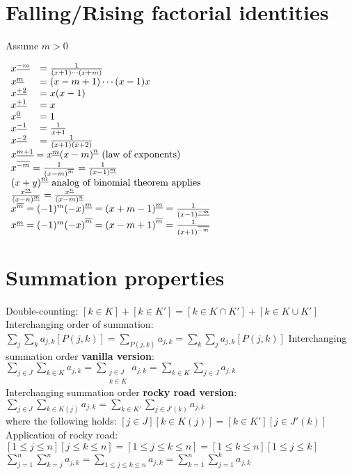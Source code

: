 \documentclass[10pt]{article}
\begin{document}
\begin{multicols}{3}
\section{Falling/Rising factorial identities}


{
\everymath{\displaystyle}
Assume $m > 0$
\begin{multicols}{2}
$
\begin{array}{ll}
x^{\underline{-m}} & = \frac{1}{(x+1)\cdots (x+m)}\\
x^{\underline{m}} & = (x-m+1) \cdots (x-1) x\\
x^{\underline{+2}} & = x(x-1)\\
x^{\underline{+1}} & = x\\
x^{\underline{0}} & = 1\\
x^{\underline{-1}} & = \frac{1}{x+1}\\
x^{\underline{-2}} & = \frac{1}{(x+1)(x+2)}\\
\end{array}
$
\vfill\null
\columnbreak
$
\begin{array}{l}
x^{\underline{m+1}} = x^{\underline{m}} {(x-m)}^{\underline{n}} \text{  (law of exponents)}\\
x^{\overline{-m}} = \frac{1}{{(x-m)}^{\overline{m}}} = \frac{1}{{(x-1)}^{\underline{m}}} \\
{(x+y)}^{\underline{m}} \text{ analog of binomial theorem applies}\\
\frac{{x}^{\underline{m}}}{{(x-n)}^{\underline{m}}} = \frac{{x}^{\underline{n}}}{{(x-m)}^{\underline{n}}} \\
{x}^{\overline{m}} = (-1)^m{(-x)}^{\underline{m}} = {(x+m-1)}^{\underline{m}} = \frac{1}{{(x-1)}^{\underline{-m}}}\\
{x}^{\underline{m}} = (-1)^m{(-x)}^{\overline{m}} = {(x-m+1)}^{\overline{m}} = \frac{1}{{(x+1)}^{\overline{-m}}}\\
\end{array}
$
\end{multicols}
}

\section{Summation properties}
{
\everymath{\displaystyle}
Double-counting: $[k \in K] + [k\in K'] = [k\in K \cap K'] + [k\in K \cup K']$\\
Interchanging order of summation: $\sum_{j} \sum_{k} a_{j,k} [P(j,k)] = \sum_{P(j,k)} a_{j,k} = \sum_{k} \sum_{j} a_{j,k} [P(j,k)]$
Interchanging summation order \textbf{vanilla version}: $\sum_{j\in J} \sum_{k\in K} a_{j,k} = \sum_{\substack{j\in J\\k\in K}} a_{j,k} = \sum_{k\in K} \sum_{j\in J} a_{j,k}$\\
Interchanging summation order \textbf{rocky road version}: $\sum_{j\in J} \sum_{k\in K(j)} a_{j,k} = \sum_{k\in K'} \sum_{j\in J'(k)} a_{j,k}$\\
where the following holds: $[j\in J][k\in K(j)] = [k\in K'][j\in J'(k)]$\\
Application of rocky road: 
$[1\leq j \leq n] [j\leq k \leq n] = [1\leq j \leq k \leq n] = [1 \leq k \leq n] [1\leq j \leq k]$\\
$\sum_{j=1}^{n} \sum_{k=j}^n a_{j,k} = \sum_{1\leq j\leq k\leq n} a_{j,k} =\sum_{k=1}^{n} \sum_{j=1}^k a_{j,k}$
}


\end{multicols}
\end{document}
